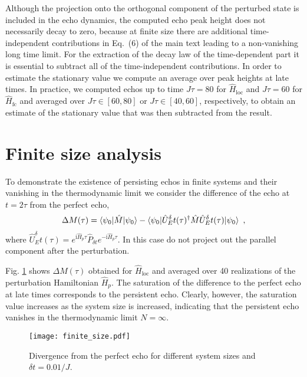 \documentclass[%
 reprint,
 amsmath,amssymb,
 prl,
]{revtex4-1}
\newcommand{\im}{\mathrm{i}}
\begin{document}
Although the projection onto the orthogonal component of the perturbed state is included in the echo dynamics, the computed echo peak height does not necessarily decay to zero, because at finite size there are additional time-independent contributions in Eq.\ (6) of the main text leading to a non-vanishing long time limit. For the extraction of the decay law of the time-dependent part it is essential to subtract all of the time-independent contributions. In order to estimate the stationary value we compute an average over peak heights at late times. In practice, we computed echos up to time $J\tau=80$ for $\hat H_\text{loc}$ and $J\tau=60$ for $\hat H_\text{fc}$ and averaged over $J\tau\in[60,80]$ or $J\tau\in[40,60]$, respectively, to obtain an estimate of the stationary value that was then subtracted from the result. 

\section{Finite size analysis}
To demonstrate the existence of persisting echos in finite systems and their vanishing in the thermodynamic limit we consider the difference of the echo at $t=2\tau$ from the perfect echo,
\begin{align}
	\Delta M(\tau)=\braket{\psi_0|\hat M|\psi_0}
	-\braket{\psi_0|\hat U_E^\delta t(\tau)^\dagger\hat M\hat U_E^\delta t(\tau)|\psi_0}\ ,
\end{align}
where $\hat U_E^\delta t(\tau)=e^{\im\hat H_p\tau}\hat P_{\delta t}e^{-\im\hat H_p\tau}$. In this case do not project out the parallel component after the perturbation.

Fig. \ref{fig:finite_size} shows $\Delta M(\tau)$ obtained for $\hat H_\text{loc}$ and averaged over 40 realizations of the perturbation Hamiltonian $\hat H_p$. The saturation of the difference to the perfect echo at late times corresponds to the persistent echo. Clearly, however, the saturation value increases as the system size is increased, indicating that the persistent echo vanishes in the thermodynamic limit $N=\infty$.
\begin{figure}[h!]
\texttt{[image: finite\_size.pdf]}
\caption{Divergence from the perfect echo for different system sizes and $\delta t=0.01/J$.}
\label{fig:finite_size}
\end{figure}
\end{document}
